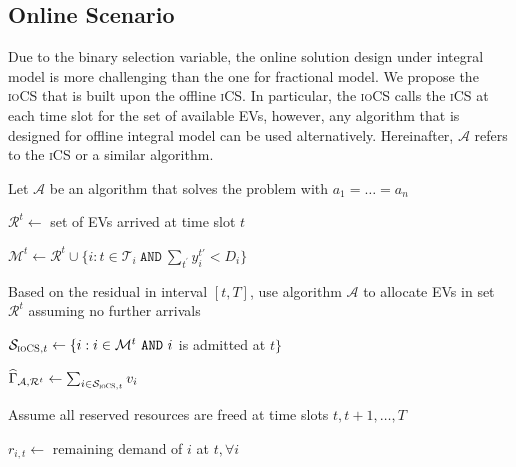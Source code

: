 \documentclass[journal]{IEEEtran}
\newcommand{\ics}{\textsc{iCS}\xspace}
\newcommand{\iocs}{\textsc{ioCS}\xspace}
\begin{document}
	
\subsection{Online Scenario}
\label{sec:onlineint}
Due to the binary selection variable, the online solution design under integral model is more challenging than the one for fractional model. We propose the \iocs that is built upon the offline \ics. In particular, the \iocs calls the \ics at each time slot for the set of available EVs, however, any algorithm that is designed for offline integral model can be used alternatively. Hereinafter, $\mathcal{A}$ refers to the \ics or a similar algorithm.

\begin{algorithm}%
\footnotesize
\caption{\iocs: $\forall t\in \{1,2,\dots ,T\}$}
\label{alg:iocs}
\DontPrintSemicolon 


\BlankLine

Let $\mathcal{A}$ be an algorithm that solves the problem with $a_1=\dots =a_n$

$\mathcal{R}^t\leftarrow$ set of EVs arrived at time slot $t$

$\mathcal{M}^t\leftarrow \mathcal{R}^t\cup \{i: t\in\mathcal{T}_i\ \texttt{AND}\ \sum_{t^\prime}y_{i}^{t'}<D_i\}$ 


Based on the residual in interval $[t,T]$, use algorithm $\mathcal{A}$ to allocate EVs in set $\mathcal{R}^t$ assuming no further arrivals 

$\mathcal{S}_{\iocs,t}\leftarrow\{i:i\in\mathcal{M}^t\ \texttt{AND}\ i$ is admitted at $t\}$

$\widehat{\Gamma}_{\mathcal{A},\mathcal{R}^t}\leftarrow \sum_{i\in\mathcal{S}_{\iocs,t}}v_i$

Assume all reserved resources are freed at time slots $t, t+1, \dots, T$



$r_{i,t}\leftarrow$ remaining demand of $i$ at $t, \forall i$



\end{algorithm}
\end{document}
